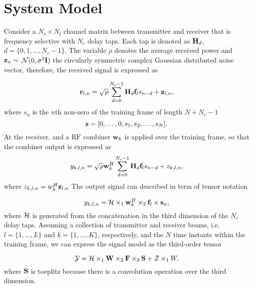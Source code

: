 \documentclass[12pt,a4paper,twoside,english]{article}
\begin{document}
	
\section{System Model}	


Consider a $N_r \times N_t$ channel matrix between transmitter and receiver that
is frequency selective with $N_c$ delay taps. Each tap is denoted as $\mathbf{H}_d$,
$d=\{0,1, \ldots, N_c-1\}$. The variable $\rho$ denotes the average received power and $\mathbf{z}_n \sim $
$\mathcal{N}(0,\sigma ^2\mathbf{I})$ the circularly symmetric complex Gaussian
distributed noise vector, therefore, the received signal is expressed as

\begin{equation}
  \label{eq:rx_signal}
   \mathbf{r}_{l,n} = \sqrt{\rho} \sum_{d=0}^{N_c-1} \mathbf{H}_d\mathbf{f}_{l}s_{n-d} + \mathbf{z}_{l,n},
\end{equation}
where $s_{n}$ is the $n$th non-zero of the training frame of length $N + N_c-1$
\begin{equation}
  \label{eq:frame}
  \mathbf{s} = [0, \ldots, 0,  s_1, s_2, \ldots, s_N ].
\end{equation}
At the receiver, and a $\textrm{RF}$  combiner $\mathbf{w}_k$ is applied over the
training frame, so that the combiner output is expressed as
\begin{equation}
  \label{eq:output_combiner}
   y_{k,l,n} = \sqrt{\rho}\mathbf{w}^H_k \sum_{d=0}^{N_c-1} \mathbf{H}_d\mathbf{f}_{l}s_{n-d} + z_{k,l,n},
 \end{equation}
 where $z_{k,l,n} = w^H_k\mathbf{z}_{l,n}$
The output signal can described in term of tensor notation

\begin{equation}
  \label{eq:output_combiner_tensor}
  y_{k,l,n} =  \mathcal{H} \times_1 \mathbf{w}^H_k \times_2 \mathbf{f}_{l} \times \mathbf{s}_n,
\end{equation}
where $\mathcal{H}$ is generated from the concatenation in the third dimension of the $N_c$ delay taps.
Assuming a collection  of transmitter and receiver beams, i.e.
$l=\{1,\ldots , L \}$ and $k=\{1,\ldots , K \}$, respectively, and the $N$ time
instants within the training frame, we can express the signal model as the
third-order tensor

\begin{equation}
  \label{eq:tensor_model}
  \mathcal{Y} =  \mathcal{H} \times_1 \mathbf{W} \times_2 \mathbf{F} \times_3 \mathbf{S} + \mathcal{Z} \times_1 W,
\end{equation}
where $\mathbf{S}$ is toeplitz because there is a convolution operation over the third dimension.
    
\end{document}
